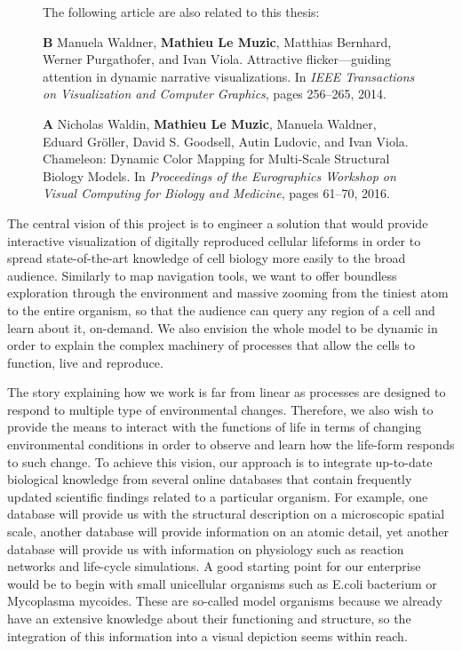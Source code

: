 \begin{figure}
{		The following article are also related to this thesis:	
		\begin{list}{}{}			
			\item[\textbf{B}]Manuela Waldner, \textbf{Mathieu Le Muzic}, Matthias Bernhard, Werner Purgathofer, and Ivan Viola. Attractive flicker—guiding attention in dynamic
			narrative visualizations. In \textit{IEEE Transactions on Visualization and Computer Graphics}, pages 256–265, 2014.	
			
			\item[\textbf{A}]Nicholas Waldin, \textbf{Mathieu Le Muzic}, Manuela Waldner, Eduard Gröller, David S. Goodsell, Autin Ludovic, and Ivan Viola. Chameleon: Dynamic Color Mapping for Multi-Scale Structural Biology Models. In \textit{Proceedings of the Eurographics Workshop on Visual Computing for Biology and Medicine}, pages 61–70, 2016.						
		\end{list}		
	}	
	\label{master-diagram}	
\end{figure}

The central vision of this project is to engineer a solution that would provide interactive visualization of digitally reproduced cellular lifeforms in order to spread state-of-the-art knowledge of cell biology more easily to the broad audience.
Similarly to map navigation tools, we want to offer boundless exploration through the environment and massive zooming from the tiniest atom to the entire organism, so that the audience can query any region of a cell and learn about it, on-demand.
We also envision the whole model to be dynamic in order to explain the complex machinery of processes that allow the cells to function, live and reproduce.

The story explaining how we work is far from linear as processes are designed to respond to multiple type of environmental changes.
Therefore, we also wish to provide the means to interact with the functions of life in terms of changing environmental conditions in order to observe and learn how the life-form responds to such change. 
To achieve this vision, our approach is to integrate up-to-date biological knowledge from several online databases that contain frequently updated scientific findings related to a particular organism. 
For example, one database will provide us with the structural description on a microscopic spatial scale, another database will provide information on an atomic detail, yet another database will provide us with information on physiology such as reaction networks and life-cycle simulations.
A good starting point for our enterprise would be to begin with small unicellular organisms such as E.coli bacterium or Mycoplasma mycoides.
These are so-called model organisms because we already have an extensive knowledge about their functioning and structure, so the integration of this information into a visual depiction seems within reach. 

